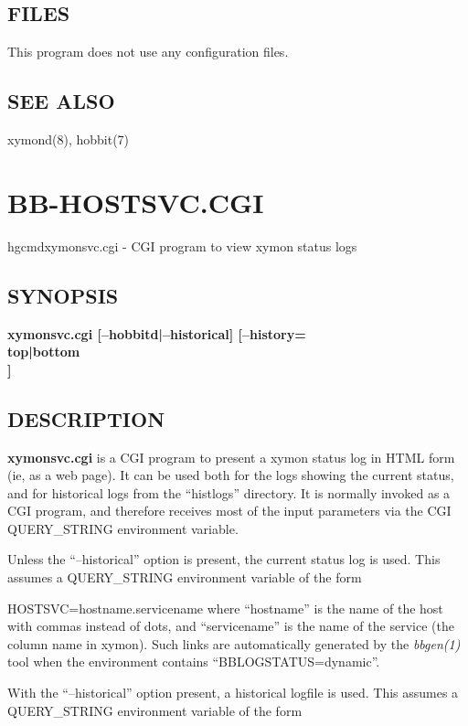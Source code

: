 \subsection{FILES}
 This program does not use any configuration files. 

 
\subsection{SEE ALSO}
xymond(8), hobbit(7) 

 
%
\newpage
\section{BB-HOSTSVC.CGI}

hgcmd{xymonsvc.cgi} - CGI program to view xymon status logs

\subsection{SYNOPSIS}
\textbf{xymonsvc.cgi [--hobbitd|--historical] [--history=\\{top|bottom\\}]}



\subsection{DESCRIPTION}
\textbf{xymonsvc.cgi}
 is a CGI program to present a xymon status log in HTML form (ie, as a web page). It can be used both for the logs showing the current status, and for historical logs from the ``histlogs'' directory. It is normally invoked as a CGI program, and therefore receives most of the input parameters via the CGI QUERY\_STRING environment variable. 

  Unless the ``--historical'' option is present, the current status log is used. This assumes a QUERY\_STRING environment variable of the form  
 
HOSTSVC=hostname.servicename  
 where ``hostname'' is the name of the host with commas instead of dots, and ``servicename'' is the name of the service (the column name in xymon). Such links are automatically generated by the \emph{bbgen(1)}
 tool when the environment contains ``BBLOGSTATUS=dynamic''. 


  With the ``--historical'' option present, a historical logfile is used. This assumes a QUERY\_STRING environment variable of the form  
 
